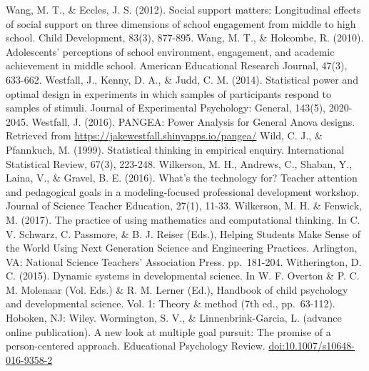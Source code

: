 \documentclass[]{msu-thesis}
\theoremstyle{definition}
\theoremstyle{definition}
\theoremstyle{definition}
\theoremstyle{remark}
\begin{document}
Wang, M. T., \& Eccles, J. S. (2012). Social support matters:
Longitudinal effects of social support on three dimensions of school
engagement from middle to high school. Child Development, 83(3),
877-895. Wang, M. T., \& Holcombe, R. (2010). Adolescents' perceptions
of school environment, engagement, and academic achievement in middle
school. American Educational Research Journal, 47(3), 633-662. Westfall,
J., Kenny, D. A., \& Judd, C. M. (2014). Statistical power and optimal
design in experiments in which samples of participants respond to
samples of stimuli. Journal of Experimental Psychology: General, 143(5),
2020-2045. Westfall, J. (2016). PANGEA: Power Analysis for General Anova
designs. Retrieved from \url{https://jakewestfall.shinyapps.io/pangea/}
Wild, C. J., \& Pfannkuch, M. (1999). Statistical thinking in empirical
enquiry. International Statistical Review, 67(3), 223-248. Wilkerson, M.
H., Andrews, C., Shaban, Y., Laina, V., \& Gravel, B. E. (2016). What's
the technology for? Teacher attention and pedagogical goals in a
modeling-focused professional development workshop. Journal of Science
Teacher Education, 27(1), 11-33. Wilkerson, M. H. \& Fenwick, M. (2017).
The practice of using mathematics and computational thinking. In C. V.
Schwarz, C. Passmore, \& B. J. Reiser (Eds.), Helping Students Make
Sense of the World Using Next Generation Science and Engineering
Practices. Arlington, VA: National Science Teachers' Association Press.
pp.~181-204. Witherington, D. C. (2015). Dynamic systems in
developmental science. In W. F. Overton \& P. C. M. Molenaar (Vol. Eds.)
\& R. M. Lerner (Ed.), Handbook of child psychology and developmental
science. Vol. 1: Theory \& method (7th ed., pp.~63-112). Hoboken, NJ:
Wiley. Wormington, S. V., \& Linnenbrink-Garcia, L. (advance online
publication). A new look at multiple goal pursuit: The promise of a
person-centered approach. Educational Psychology Review.
\url{doi:10.1007/s10648-016-9358-2}


\end{document}
